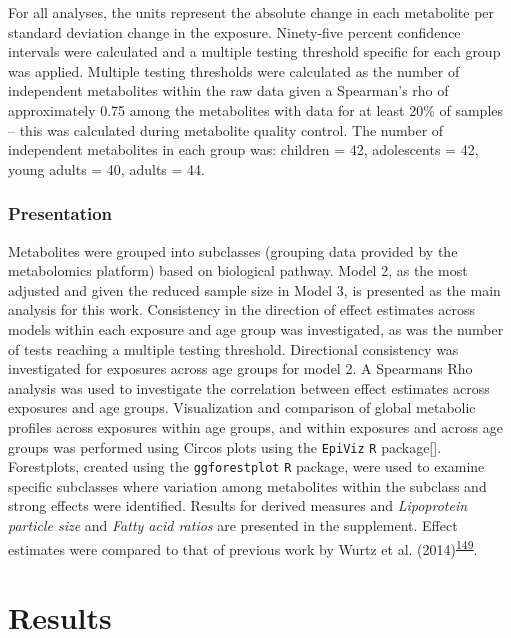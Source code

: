 \documentclass[11pt,twoside]{bristolthesis}
\begin{document}
For all analyses, the units represent the absolute change in each metabolite per standard deviation change in the exposure. Ninety-five percent confidence intervals were calculated and a multiple testing threshold specific for each group was applied. Multiple testing thresholds were calculated as the number of independent metabolites within the raw data given a Spearman's rho of approximately 0.75 among the metabolites with data for at least 20\% of samples -- this was calculated during metabolite quality control. The number of independent metabolites in each group was: children = 42, adolescents = 42, young adults = 40, adults = 44.

\hypertarget{presentation}{%
\subsubsection{Presentation}\label{presentation}}

Metabolites were grouped into subclasses (grouping data provided by the metabolomics platform) based on biological pathway. Model 2, as the most adjusted and given the reduced sample size in Model 3, is presented as the main analysis for this work. Consistency in the direction of effect estimates across models within each exposure and age group was investigated, as was the number of tests reaching a multiple testing threshold. Directional consistency was investigated for exposures across age groups for model 2. A Spearmans Rho analysis was used to investigate the correlation between effect estimates across exposures and age groups. Visualization and comparison of global metabolic profiles across exposures within age groups, and within exposures and across age groups was performed using Circos plots using the \texttt{EpiViz} \texttt{R} package{[}{]}. Forestplots, created using the \texttt{ggforestplot} \texttt{R} package, were used to examine specific subclasses where variation among metabolites within the subclass and strong effects were identified. Results for derived measures and \emph{Lipoprotein particle size} and \emph{Fatty acid ratios} are presented in the supplement. Effect estimates were compared to that of previous work by Wurtz et al. (2014)\textsuperscript{\protect\hyperlink{ref-Wurtz2014}{149}}.

\newpage

\hypertarget{results}{%
\section{Results}\label{results}}
\end{document}
